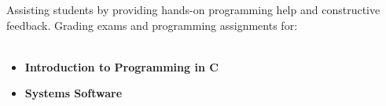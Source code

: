 
Assisting students by providing hands-on programming help and constructive feedback. Grading exams and programming assignments for: \\ \ 

\begin{itemize}
    \item \textbf{Introduction to Programming in C}
    \item \textbf{Systems Software}
\end{itemize}